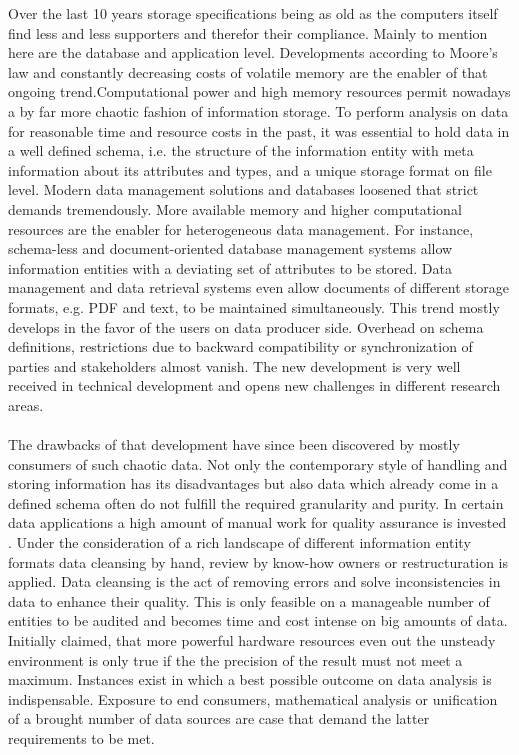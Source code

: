 Over the last 10 years storage specifications being as old as the computers itself find less and less supporters and therefor their compliance\cite{andlinger_2013}. Mainly to mention here are the database and application level. Developments according to Moore's law\cite[p. 7ff, p. 87ff]{brock_2006} and constantly decreasing  costs of volatile memory are the enabler of that ongoing trend\cite{rhines_2016}.Computational power and high memory resources permit nowadays a by far more chaotic fashion of information storage. To perform analysis on data for reasonable time and resource costs in the past, it was essential to hold data in a well defined schema, i.e. the structure of the information entity with meta information about its attributes and types, and a unique storage format on file level. Modern data management solutions and databases loosened that strict demands tremendously. More available memory and higher computational resources are the enabler for heterogeneous data management. For instance, schema-less and document-oriented database management systems allow information entities with a deviating set of attributes to be stored\cite{hills_2016}. Data management and data retrieval systems even allow documents of different storage formats, e.g. PDF and text, to be maintained simultaneously. This trend mostly develops in the favor of the users on data producer side. Overhead on schema definitions, restrictions due to backward compatibility or synchronization of parties and stakeholders almost vanish. The new development is very well received in technical development and opens new challenges in different research areas.
\\\\
The drawbacks of that development have since been discovered by mostly consumers of such chaotic data\cite{lombardo_di_nitto_ardagna_2012}. Not only the contemporary style of handling and storing information has its disadvantages but also data which already come in a defined schema often do not fulfill the required granularity and purity. In certain data applications a high amount of manual work for quality assurance is invested \cite{wang_strong_1996}. Under the consideration of a rich landscape of different information entity formats data cleansing by hand, review by know-how owners or restructuration is applied. Data cleansing is the act of removing errors and solve inconsistencies in data to enhance their quality. This is only feasible on a manageable number of entities to be audited and becomes time and cost intense on big amounts of data. Initially claimed, that more powerful hardware resources even out the unsteady environment is only true if the the precision of the result must not meet a maximum. Instances exist in which a best possible outcome on data analysis is indispensable. Exposure to end consumers, mathematical analysis or unification of a brought number of data sources are case that demand the latter requirements to be met. 


